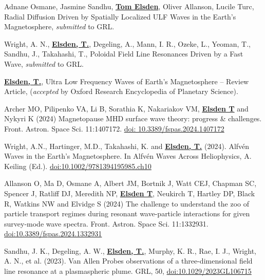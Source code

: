 \documentclass[11pt,a4paper]{article} %
\newcommand\vs{\vspace{-0.25cm}}
\begin{document}
\begin{etaremune}	%


\item Adnane Osmane, Jasmine Sandhu, \underline{\textbf{Tom Elsden}}, Oliver Allanson, Lucile Turc, Radial Diffusion Driven by Spatially Localized ULF Waves in the Earth's Magnetosphere, \textit{submitted} to GRL.

\vs
\item
Wright, A. N., \underline{\textbf{Elsden, T.}}, Degeling, A., Mann, I. R., Ozeke, L., Yeoman, T., Sandhu, J., Takahashi, T., Poloidal Field Line Resonances Driven by a Fast Wave, \textit{submitted} to GRL.

\vs
\item \underline{\textbf{Elsden, T.}}, Ultra Low Frequency Waves of Earth's Magnetosphere – Review Article, (\textit{accepted} by Oxford Research Encyclopedia of Planetary Science).

\vs
\item Archer MO, Pilipenko VA, Li B, Sorathia K, Nakariakov VM, \underline{\textbf{Elsden T}} and Nykyri K (2024) Magnetopause MHD surface wave theory: progress \& challenges. Front. Astron. Space Sci. 11:1407172. \href{https://doi.org/10.3389/fspas.2024.1407172}{doi: 10.3389/fspas.2024.1407172}
\vs

\item Wright, A.N., Hartinger, M.D., Takahashi, K. and  \underline{\textbf{Elsden, T.}} (2024). Alfvén Waves in the Earth's Magnetosphere. In Alfvén Waves Across Heliophysics, A. Keiling (Ed.).
\newline 
\href{https://doi.org/10.1002/9781394195985.ch10}{doi:10.1002/9781394195985.ch10}
\vs 

\item Allanson O, Ma D, Osmane A, Albert JM, Bortnik J, Watt CEJ, Chapman SC, Spencer J, Ratliff DJ, Meredith NP, \underline{\textbf{Elsden T}}, Neukirch T, Hartley DP, Black R, Watkins NW and Elvidge S (2024) The challenge to understand the zoo of particle transport regimes during resonant wave-particle interactions for given survey-mode wave spectra. Front. Astron. Space Sci. 11:1332931. 
\newline \href{https://doi.org/10.3389/fspas.2024.1332931}{doi:10.3389/fspas.2024.1332931}

\vs
\item Sandhu, J. K., Degeling, A. W., \underline{\textbf{Elsden, T.}}, Murphy, K. R., Rae, I. J., Wright, A. N., et al. (2023). Van Allen Probes observations of a three-dimensional field line resonance at a plasmaspheric plume. GRL, 50, 
\href{https://doi.org/10.1029/2023GL106715}{doi:10.1029/2023GL106715}
\vs



\end{etaremune}
\end{document}
